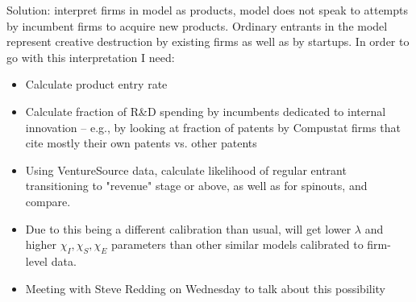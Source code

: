 \documentclass[12pt,english]{article}
\theoremstyle{remark}
\begin{document}
Solution: interpret firms in model as products, model does not speak to attempts by incumbent firms to acquire new products. Ordinary entrants in the model represent creative destruction by existing firms as well as by startups. In order to go with this interpretation I need:

\begin{itemize}
	\item Calculate product entry rate
	\item Calculate fraction of R\&D spending by incumbents dedicated to internal innovation -- e.g., by looking at fraction of patents by Compustat firms that cite mostly their own patents vs. other patents
	\item Using VentureSource data, calculate likelihood of regular entrant transitioning to "revenue" stage or above, as well as for spinouts, and compare.
	\item Due to this being a different calibration than usual, will get lower $\lambda$ and higher $\chi_I,\chi_S,\chi_E$ parameters than other similar models calibrated to firm-level data.
	\item Meeting with Steve Redding on Wednesday to talk about this possibility
\end{itemize}
\end{document}
